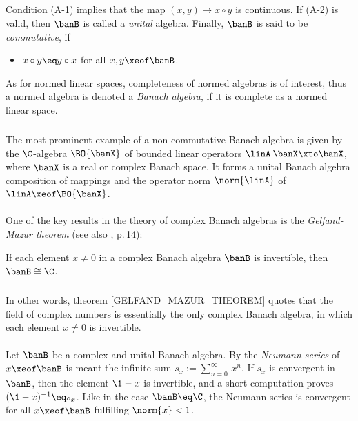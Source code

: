 \documentclass[11pt,twoside]{article}
\begin{document}
\subparagraph{}
Condition (A-1) implies
that the map $(x,y) \mapsto x \circ y$ is continuous.
If (A-2) is valid,
then $\banB$ is called a \textit{unital} algebra.
Finally,
$\banB$ is said to be \textit{commutative},
if
\begin{itemize}[leftmargin=16mm,itemsep=2pt]
\item[(A-3)]
\;$x \circ y \eq y \circ x$ \; for all $x,y \xeof \banB$.
\end{itemize}
As for normed linear spaces,
completeness of normed algebras is of interest,
thus a normed algebra is denoted a \textit{Banach algebra},
if it is complete as a normed linear space.

\subparagraph{} %
The most prominent example of a non-commutative Banach algebra is given by
the $\C$-algebra $\BO{\banX}$ of bounded linear operators
$\linA \:\banX \xto \banX$,
where $\banX$ is a real or complex Banach space.
It forms a unital Banach algebra {\wrt} composition of mappings
and the operator norm $\norm{\linA}$ of $\linA \xeof \BO{\banX}$.

\paragraph{} %
One of the key results in the theory of complex Banach algebras
is the \textit{Gelfand-Mazur theorem}
(see also \cite{VII_Ka}, p.\,14):

\begin{theorem1}\label{GELFAND_MAZUR_THEOREM}
If each element $x \neq 0$ in a complex Banach algebra $\banB$ is invertible,
then $\banB \cong \C$.
\end{theorem1}

\subparagraph{}
In other words, 
theorem \ref{GELFAND_MAZUR_THEOREM} quotes that
the field of complex numbers is essentially the only complex Banach algebra,
in which each element $x \neq 0$ is invertible.

\paragraph{} %
Let $\banB$ be a complex and unital Banach algebra.
By the \textit{Neumann series} of $x \xeof \banB$ is meant the infinite sum
$
s_x := \sum_{n=0}^{\infty} \, x^n.
$
If $s_x$ is convergent in $\banB$,
then the element $\1-x$ is invertible,
and a short computation proves $(\1-x)^{-1} \eq s_x$.
Like in the case $\banB \eq \C$,
the {Neumann series} is convergent for all $x \xeof \banB$
fulfilling $\norm{x} < 1$.
\end{document}
